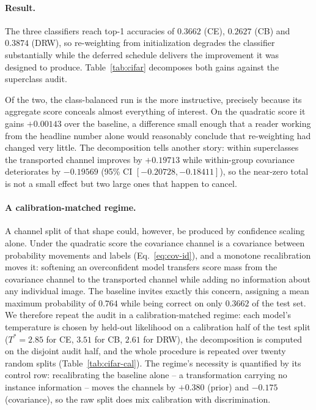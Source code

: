 \paragraph{Result.} The three classifiers reach top-1 accuracies of $0.3662$ (CE),
$0.2627$ (CB) and $0.3874$ (DRW), so re-weighting from initialization degrades the
classifier substantially while the deferred schedule delivers the improvement it was
designed to produce. Table~\ref{tab:cifar} decomposes both gains against the superclass
audit.

Of the two, the class-balanced run is the more instructive, precisely because its
aggregate score conceals almost everything of interest. On the quadratic score it gains
$+0.00143$ over the baseline, a difference small enough that a reader working from the
headline number alone would reasonably conclude that re-weighting had changed very
little. The decomposition tells another story: within superclasses the
transported channel improves by $+0.19713$ while within-group covariance deteriorates
by $-0.19569$ (95\% CI $[-0.20728,-0.18411]$), so the near-zero total is not a small
effect but two large ones that happen to cancel.

\paragraph{A calibration-matched regime.} A channel split of that shape could, however,
be produced by confidence scaling alone. Under the quadratic score the covariance channel
is a covariance between probability movements and labels
(Eq.~\eqref{eq:cov-id}), and a monotone recalibration moves it: softening an
overconfident model transfers score mass from the covariance channel to the transported channel while
adding no information about any individual image. The baseline invites exactly this
concern, assigning a mean maximum probability of $0.764$ while being correct on only
$0.3662$ of the test set. We therefore repeat the audit in a calibration-matched regime:
each model's temperature is chosen by held-out likelihood on a calibration half of the
test split ($T^*=2.85$ for CE, $3.51$ for CB, $2.61$ for DRW), the decomposition is
computed on the disjoint audit half, and the whole procedure is repeated over twenty
random splits (Table~\ref{tab:cifar-cal}). The regime's necessity is quantified by its
control row: recalibrating the baseline alone -- a transformation carrying no instance
information -- moves the channels by $+0.380$ (prior) and $-0.175$ (covariance), so the
raw split does mix calibration with discrimination.

